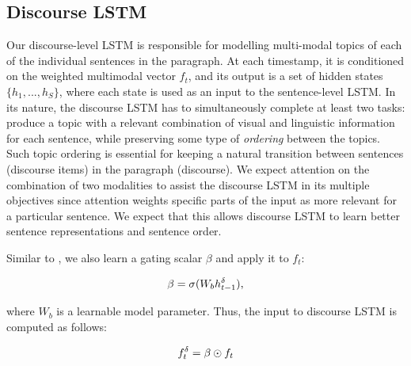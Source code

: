 \documentclass[11pt,a4paper]{article}
\begin{document}

\subsection{Discourse LSTM}
Our discourse-level LSTM is responsible for modelling multi-modal topics of each of the individual sentences in the paragraph.
At each timestamp, it is conditioned on the weighted multimodal vector $f_t$, and its output is a set of hidden states $\{h_1, ..., h_S\}$, where each state is used as an input to the sentence-level LSTM.
In its nature, the discourse LSTM has to simultaneously complete at least two tasks: produce a topic with a relevant combination of visual and linguistic information for each sentence, while preserving some type of \textit{ordering} between the topics.
Such topic ordering is essential for keeping a natural transition between sentences (discourse items) in the paragraph (discourse).
We expect attention on the combination of two modalities to assist the discourse LSTM in its multiple objectives since attention weights specific parts of the input as more relevant for a particular sentence.
We expect that this allows discourse LSTM to learn better sentence representations and sentence order.

Similar to , we also learn a gating scalar $\beta$ and apply it to $f_t$:

\begin{equation}
	\beta = \sigma(W_b h\sp{\delta}_{t-1}),
\end{equation}

where $W_b$ is a learnable model parameter.
Thus, the input to discourse LSTM is computed as follows:

\begin{equation}
	f_t\sp\delta = \beta \odot f_t
\end{equation}

\end{document}

